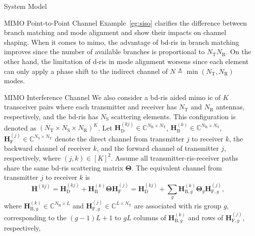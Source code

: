 \documentclass[journal]{IEEEtran}
\begin{document}
\begin{section}{System Model}
\begin{subsection}{MIMO Point-to-Point Channel}
		Example~\ref{eg:siso} clarifies the difference between branch matching and mode alignment and show their impacts on channel shaping.
		When it comes to \gls{mimo}, the advantage of \gls{bd}-\gls{ris} in branch matching improves since the number of available branches is proportional to $N_\mathrm{T} N_\mathrm{R}$. On the other hand, the limitation of \gls{d}-\gls{ris} in mode alignment worsens since each element can only apply a phase shift to the indirect channel of $N \triangleq \min(N_\mathrm{T}, N_\mathrm{R})$ modes.
	\end{subsection}

	\begin{subsection}{MIMO Interference Channel}
		We also consider a \gls{bd}-\gls{ris} aided \gls{mimo} \gls{ic} of $K$ transceiver pairs where each transmitter and receiver has $N_\mathrm{T}$ and $N_\mathrm{R}$ antennas, respectively, and the \gls{bd}-\gls{ris} has $N_\mathrm{S}$ scattering elements.
		This configuration is denoted as $(N_\mathrm{T} \times N_\mathrm{S} \times N_\mathrm{R})^K$.
		Let $\mathbf{H}_\mathrm{D}^{(kj)} \in \mathbb{C}^{N_\mathrm{R} \times N_\mathrm{T}}$, $\mathbf{H}_\mathrm{B}^{(k)} \in \mathbb{C}^{N_\mathrm{R} \times N_\mathrm{S}}$, $\mathbf{H}_\mathrm{F}^{(j)} \in \mathbb{C}^{N_\mathrm{S} \times N_\mathrm{T}}$ denote the direct channel from transmitter $j$ to receiver $k$, the backward channel of receiver $k$, and the forward channel of transmitter $j$, respectively, where $(j,k) \in [K]^2$.
		Assume all transmitter-\gls{ris}-receiver paths share the same \gls{bd}-\gls{ris} scattering matrix $\mathbf{\Theta}$.
		The equivalent channel from transmitter $j$ to receiver $k$ is
		\begin{equation}
			\label{eq:channel_interference}
			\mathbf{H}^{(kj)} = \mathbf{H}_\mathrm{D}^{(kj)} + \mathbf{H}_\mathrm{B}^{(k)} \mathbf{\Theta} \mathbf{H}_\mathrm{F}^{(j)} = \mathbf{H}_\mathrm{D}^{(kj)} + \sum_g \mathbf{H}_{\mathrm{B},g}^{(k)} \mathbf{\Theta}_g \mathbf{H}_{\mathrm{F},g}^{(j)},
		\end{equation}
		where $\mathbf{H}_{\mathrm{B},g}^{(k)} \in \mathbb{C}^{N_\mathrm{R} \times L}$ and $\mathbf{H}_{\mathrm{F},g}^{(j)} \in \mathbb{C}^{L \times N_\mathrm{T}}$ are associated with \gls{ris} group $g$, corresponding to the $(g{-}1)L{+}1$ to $gL$ columns of $\mathbf{H}_{\mathrm{B},g}^{(k)}$ and rows of $\mathbf{H}_{\mathrm{F},g}^{(j)}$, respectively,
	\end{subsection}
\end{section}
\end{document}
